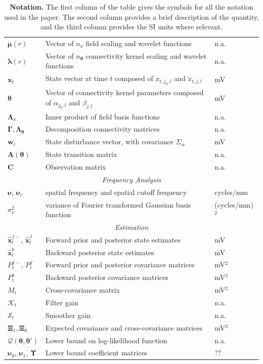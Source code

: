 \documentclass[review,authoryear,3p]{elsarticle}
\begin{document}
\begin{table}[!t]
\begin{tabular}{|l|l|l|}
	\hline
		$\boldsymbol\mu(r)$&Vector of $n_x$ field scaling and wavelet functions&n.a.\\
		$\boldsymbol\lambda(r)$&Vector of $n_{\boldsymbol\theta}$ connectivity kernel scaling and wavelet functions&n.a.\\
   	$\mathbf{x}_t$ & State vector at time $t$ composed of  $x_{t,j_{0},l}$ and $\check{x}_{t,j,l}$ & mV\\ 
		$\boldsymbol\theta$&Vector of connectivity kernel parameters composed of $\alpha_{j_0,l}$ and $\beta_{j,l}$&mV\\ 
		$\boldsymbol{\Lambda}_x$&Inner product of field basis functions&n.a.\\
		$\boldsymbol\Gamma, \boldsymbol\Lambda_{\boldsymbol{\theta}}$&Decomposition connectivity matrices&n.a.\\
   	$\mathbf{w}_t$ & State disturbance vector, with covariance $\Sigma_w$ & mV\\ 
    $\mathbf{A}(\boldsymbol{\theta})$& State transition matrix& n.a.\\
   	$\mathbf{C}$ & Observation matrix & n.a. \\
	\hline
	\multicolumn{3}{|c|}{\emph{Frequency Analysis}} \\
	\hline
	$\boldsymbol{\nu}$, $\boldsymbol{\nu}_c$ & spatial frequency and spatial cutoff frequency & cycles/mm \\
	$\sigma_{\nu}^2$ & variance of Fourier transformed Gaussian basis function & (cycles/mm)$^2$\\
	\hline
	\multicolumn{3}{|c|}{\emph{Estimation}} \\
	\hline
	$\hat{\mathbf{x}}_t^{f-}$, $\hat{\mathbf{x}}_t^f$ & Forward prior and posterior state estimates & mV\\
	$\hat{\mathbf{x}}_t^{b}$ & Backward posterior state estimates & mV\\
	$P^{f-}_t$, $P^f_t$  & Forward prior and posterior covariance matrices & mV$^2$\\
	$P^b_t$ & Backward posterior covariance matrices & mV$^2$\\
	$M_t$& Cross-covariance matrix & mV$^2$\\
	$\mathcal K_{t} $ & Filter gain & n.a.\\ 
	$\mathcal S_{t} $ & Smoother gain & n.a.\\ 
	$\boldsymbol\Xi_1, \boldsymbol\Xi_0$&Expected covariance and cross-covariance matrices& mV$^2$\\ 
	$\mathcal{Q}(\boldsymbol{\theta},\boldsymbol\theta')$&Lower bound on log-likelihood function&n.a.\\
	$\boldsymbol\nu_0$, $\boldsymbol\nu_1$, $\boldsymbol\Upsilon$&Lower bound coefficient matrices&??\\
	\hline
\end{tabular}
\caption{\textbf{Notation.} The first column of the table gives the symbols for all the notation used in the paper. The second column provides a brief description of the quantity, and the third column provides the SI units where relevant.}
\label{tab:Notation}
\end{table}  
\doublespacing
\end{document}
